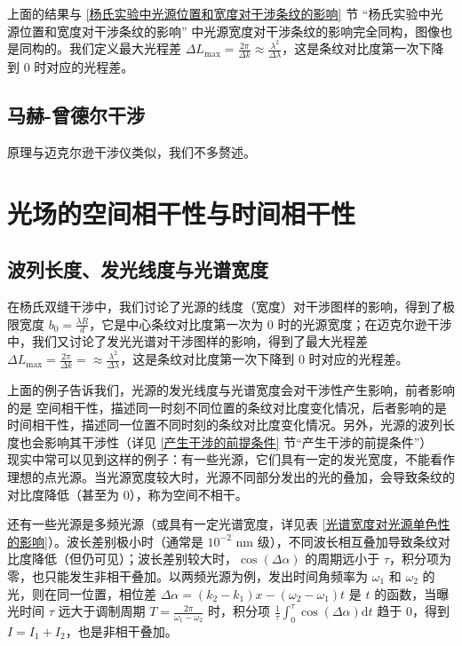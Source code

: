 \documentclass[UTF8]{report}
\theoremstyle{MyLineTheoremStyle} %
\theoremstyle{MyBlockTheoremStyle} %
\theoremstyle{MySubsubsectionStyle} %
\begin{document}
上面的结果与 \ref{杨氏实验中光源位置和宽度对干涉条纹的影响} 节 “杨氏实验中光源位置和宽度对干涉条纹的影响” 中光源宽度对干涉条纹的影响完全同构，图像也是同构的。我们定义最大光程差 $\Delta L_{\max} = \frac{2 \pi}{\Delta k} \approx \frac{\lambda^2}{\Delta \lambda}$，这是条纹对比度第一次下降到 0 时对应的光程差。

\subsection{马赫-曾德尔干涉}

原理与迈克尔逊干涉仪类似，我们不多赘述。

\section{光场的空间相干性与时间相干性}\label{光场的空间相干性与时间相干性}

\subsection{波列长度、发光线度与光谱宽度}

在杨氏双缝干涉中，我们讨论了光源的线度（宽度）对干涉图样的影响，得到了极限宽度 $b_0 = \frac{\lambda R}{d}$，它是中心条纹对比度第一次为 0 时的光源宽度；在迈克尔逊干涉中，我们又讨论了发光光谱对干涉图样的影响，得到了最大光程差 $\Delta L_{\max} = \frac{2 \pi}{\Delta k} = \approx \frac{\lambda^2}{\Delta \lambda}$，这是条纹对比度第一次下降到 0 时对应的光程差。

上面的例子告诉我们，光源的发光线度与光谱宽度会对干涉性产生影响，前者影响的是 {\color{red} 空间相干性}，描述同一时刻不同位置的条纹对比度变化情况，后者影响的是 {\color{red} 时间相干性}，描述同一位置不同时刻的条纹对比度变化情况。另外，光源的波列长度也会影响其干涉性（详见 \ref{产生干涉的前提条件} 节“产生干涉的前提条件”）
\\

现实中常可以见到这样的例子：有一些光源，它们具有一定的发光宽度，不能看作理想的点光源。当光源宽度较大时，光源不同部分发出的光的叠加，会导致条纹的对比度降低（甚至为 0），称为空间不相干。

还有一些光源是多频光源（或具有一定光谱宽度，详见表 \ref{光谱宽度对光源单色性的影响}）。波长差别极小时（通常是 $10^{-2}$ nm 级），不同波长相互叠加导致条纹对比度降低（但仍可见）；波长差别较大时，$\cos(\Delta \alpha)$ 的周期远小于 $\tau$，积分项为零，也只能发生非相干叠加。以两频光源为例，发出时间角频率为 $\omega_1$ 和 $\omega_2$ 的光，则在同一位置，相位差 $\Delta \alpha = (k_2 - k_1)x - (\omega_2 - \omega_1)t$ 是 $t$ 的函数，当曝光时间 $\tau$ 远大于调制周期 $T = \frac{2 \pi}{\omega_1 - \omega_2}$ 时，积分项 $\frac{1}{\tau}\int_{0}^{\tau}  \cos(\Delta \alpha) \mathrm{d} t$ 趋于 0，得到 $I = I_1 + I_2$，也是非相干叠加。
\end{document}
